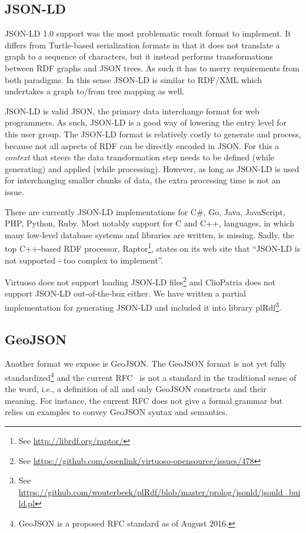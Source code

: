 \documentclass[a4paper]{scrartcl}
\newcommand{\seeUrl}[1]{\footnote{See \mbox{\url{#1}}}}
\begin{document}
\subsection{JSON-LD}
\label{sec:jsonld}

JSON-LD 1.0 support was the most problematic result format to
implement.  It differs from Turtle-based serialization formats in that
it does not translate a graph to a sequence of characters, but it
instead performs transformations between RDF graphs and JSON trees.
As such it has to merry requirements from both paradigms.  In this
sense JSON-LD is similar to RDF/XML which undertakes a graph to/from
tree mapping as well.

JSON-LD is valid JSON, the primary data interchange format for web
programmers.  As such, JSON-LD is a good way of lowering the entry
level for this user group.  The JSON-LD format is relatively costly to
generate and process, because not all aspects of RDF can be directly
encoded in JSON.  For this a \emph{context} that steers the data
transformation step needs to be defined (while generating) and applied
(while processing).  However, as long as JSON-LD is used for
interchanging smaller chunks of data, the extra processing time is not
an issue.

There are currently JSON-LD implementations for C\#, Go, Java,
JavaScript, PHP, Python, Ruby.  Most notably support for C and C++,
languages, in which many low-level database systems and libraries are
written, is missing.  Sadly, the top C++-based RDF processor,
Raptor\seeUrl{http://librdf.org/raptor/}, states on its web site that
``JSON-LD is not supported - too complex to implement''.

Virtuoso does not support loading JSON-LD
files\seeUrl{https://github.com/openlink/virtuoso-opensource/issues/478}
and ClioPatria does not support JSON-LD out-of-the-box either.  We
have written a partial implementation for generating JSON-LD and
included it into library plRdf\seeUrl{https://github.com/wouterbeek/plRdf/blob/master/prolog/jsonld/jsonld_build.pl}.


\subsection{GeoJSON}
\label{sec:geojson}

Another format we expose is GeoJSON.  The GeoJSON format is not yet
fully standardized\footnote{GeoJSON is a proposed RFC standard as of
  August 2016.} and the current RFC~\cite{Butler2016} is not a
standard in the traditional sense of the word, i.e., a definition of
all and only GeoJSON constructs and their meaning.  For instance, the
current RFC does not give a formal grammar but relies on examples to
convey GeoJSON syntax and semantics.
\end{document}
